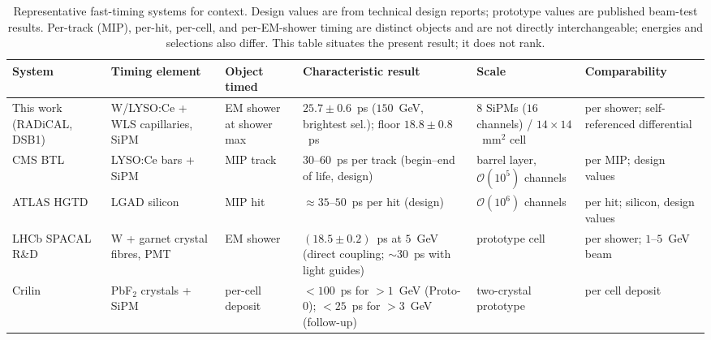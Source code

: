 \begin{table}[t]
\centering
\caption{Representative fast-timing systems for context. Design values are from technical
design reports; prototype values are published beam-test results. Per-track (MIP), per-hit,
per-cell, and per-EM-shower timing are distinct objects and are not directly interchangeable;
energies and selections also differ. This table situates the present result; it does not rank.}
\label{tab:bench}
\footnotesize
\setlength{\tabcolsep}{4pt}
\begin{tabular}{@{}>{\raggedright\arraybackslash}p{2.4cm}>{\raggedright\arraybackslash}p{2.8cm}>{\raggedright\arraybackslash}p{1.8cm}>{\raggedright\arraybackslash}p{5.0cm}>{\raggedright\arraybackslash}p{2.6cm}>{\raggedright\arraybackslash}p{2.3cm}@{}}
\toprule
System & Timing element & Object timed & Characteristic result & Scale & Comparability \\
\midrule
This work (RADiCAL, DSB1) & W/LYSO:Ce + WLS capillaries, SiPM & EM shower at shower max &
$25.7\pm0.6$~ps ($150$~GeV, brightest sel.); floor $18.8\pm0.8$~ps & $8$ SiPMs ($16$ channels) / $14{\times}14$~mm$^2$ cell &
per shower; self-referenced differential \\
CMS BTL~\cite{cmsmtd} & LYSO:Ce bars + SiPM & MIP track & $30$--$60$~ps per track (begin--end of life, design) &
barrel layer, $\mathcal{O}(10^5)$ channels & per MIP; design values \\
ATLAS HGTD~\cite{hgtd} & LGAD silicon & MIP hit & $\approx\!35$--$50$~ps per hit (design) &
$\mathcal{O}(10^6)$ channels & per hit; silicon, design values \\
LHCb SPACAL R\&D~\cite{spacal} & W + garnet crystal fibres, PMT & EM shower &
$(18.5\pm0.2)$~ps at $5$~GeV (direct coupling; $\sim\!30$~ps with light guides) & prototype cell &
per shower; $1$--$5$~GeV beam \\
Crilin~\cite{crilin,cantone2023} & PbF$_2$ crystals + SiPM & per-cell deposit &
$<100$~ps for $>1$~GeV (Proto-0); $<25$~ps for $>3$~GeV (follow-up) & two-crystal prototype &
per cell deposit \\
\bottomrule
\end{tabular}
\end{table}
